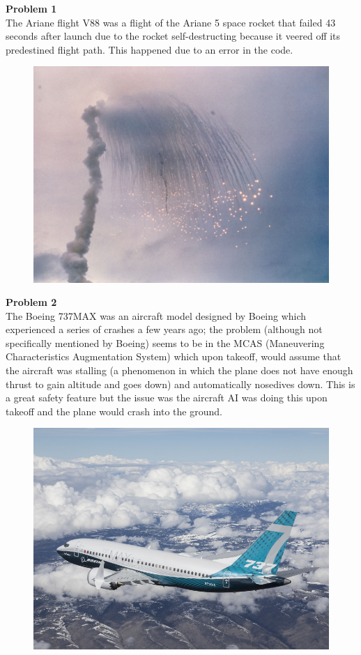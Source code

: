 \documentclass{article}
\newenvironment{problem}[2][Problem]
    { \begin{mdframed}[backgroundcolor=gray!20] \textbf{#1 #2} \\}
    {  \end{mdframed}}
\begin{document}
    \begin{problem}{1}
    	The Ariane flight V88 was a flight of the Ariane 5 space rocket that failed 43 seconds after launch due to the rocket self-destructing because it veered off its predestined flight path. This happened due to an error in the code.
    	\begin{figure}[H]
    	\centering
    	\includegraphics[width=1\linewidth]{ariane5.jpg}
    	\end{figure}
    \end{problem}
    
    \newpage
    \begin{problem}{2}
    	The Boeing 737MAX was an aircraft model designed by Boeing which experienced a series of crashes a few years ago; the problem (although not specifically mentioned by Boeing) seems to be in the MCAS (Maneuvering Characteristics Augmentation System) which upon takeoff, would assume that the aircraft was stalling (a phenomenon in which the plane does not have enough thrust to gain altitude and goes down) and automatically nosedives down. This is a great safety feature but the issue was the aircraft AI was doing this upon takeoff and the plane would crash into the ground.
    	\begin{figure}[H]
    	\centering
    	\includegraphics[width=1\linewidth]{737max.jpg}
    	\end{figure}
    \end{problem}
\end{document}
